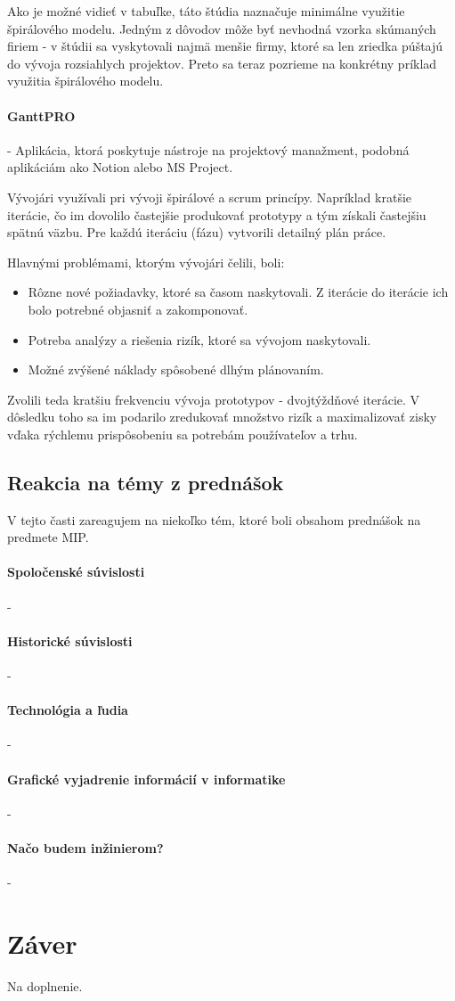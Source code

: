 \documentclass[10pt,twoside,slovak,a4paper]{article}
\begin{document}
Ako je možné vidieť v tabuľke, táto štúdia naznačuje minimálne využitie špirálového modelu. Jedným z dôvodov môže byť nevhodná vzorka skúmaných firiem - v štúdii sa vyskytovali najmä menšie firmy, ktoré sa len zriedka púštajú do vývoja rozsiahlych projektov. Preto sa teraz pozrieme na konkrétny príklad využitia špirálového modelu.

\paragraph{GanttPRO} - Aplikácia, ktorá poskytuje nástroje na projektový manažment, podobná aplikáciám ako Notion alebo MS Project.

Vývojári využívali pri vývoji špirálové a scrum princípy. Napríklad kratšie iterácie, čo im dovolilo častejšie produkovať prototypy a tým získali častejšiu spätnú väzbu. Pre každú iteráciu (fázu) vytvorili detailný plán práce.

Hlavnými problémami, ktorým vývojári čelili, boli:
\begin{itemize}
\item Rôzne nové požiadavky, ktoré sa časom naskytovali. Z iterácie do iterácie ich bolo potrebné objasniť a zakomponovať.
\item Potreba analýzy a riešenia rizík, ktoré sa vývojom naskytovali.
\item Možné zvýšené náklady spôsobené dlhým plánovaním.
\end{itemize}
Zvolili teda kratšiu frekvenciu vývoja prototypov - dvojtýždňové iterácie. V dôsledku toho sa im podarilo zredukovať množstvo rizík a maximalizovať zisky vďaka rýchlemu prispôsobeniu sa potrebám používateľov a trhu. \cite{SpiralModelExample}

\subsection{Reakcia na témy z prednášok} \label{reakciaNaTemy}
V tejto časti zareagujem na niekoľko tém, ktoré boli obsahom prednášok na predmete MIP.
\paragraph{Spoločenské súvislosti} - 
\paragraph{Historické súvislosti} - 
\paragraph{Technológia a ľudia} - 
 \paragraph{Grafické vyjadrenie informácií v informatike} - 
 \paragraph{Načo budem inžinierom?} - 


\section{Záver} \label{zaver} 
Na doplnenie.





\end{document}
